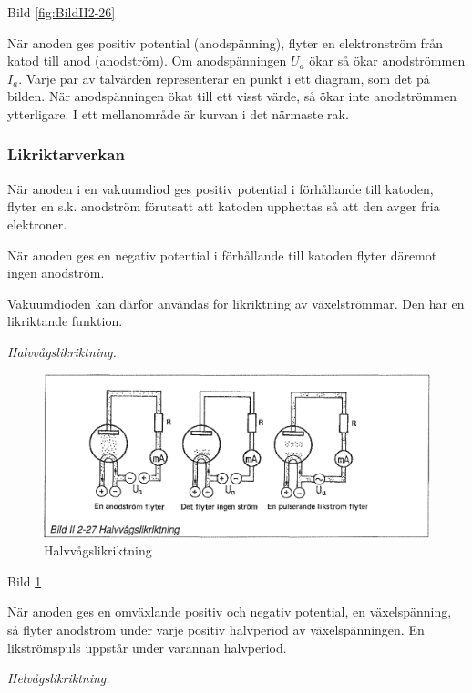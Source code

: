 Bild \ref{fig:BildII2-26}

När anoden ges positiv potential (anodspänning), flyter en elektronström från
katod till anod (anodström). Om anodspänningen \(U_a\) ökar så ökar anodströmmen
\(I_a\). Varje par av talvärden representerar en punkt i ett diagram, som det på
bilden. När anodspänningen ökat till ett visst värde, så ökar inte anodströmmen
ytterligare. I ett mellanområde är kurvan
i det närmaste rak.

\subsubsection{Likriktarverkan}

När anoden i en vakuumdiod ges positiv potential i förhållande till katoden,
flyter en s.k. anodström förutsatt att katoden upphettas så att den avger fria
elektroner.

När anoden ges en negativ potential i förhållande till katoden flyter däremot
ingen anodström.

Vakuumdioden kan därför användas för likriktning av växelströmmar. Den har en
likriktande funktion.

\emph{Halvvågslikriktning.}

\begin{figure}[h]
\begin{center}
\includegraphics[width=14cm]{images/bild_2_2-27}
\caption{Halvvågslikriktning}
\label{fig:BildII2-27}
\end{center}
\end{figure}

Bild \ref{fig:BildII2-27}

När anoden ges en omväxlande positiv och negativ potential, en växelspänning, så
flyter anodström under varje positiv halvperiod av växelspänningen. En
likströmspuls uppstår under varannan halvperiod.

\emph{Helvågslikriktning.}

